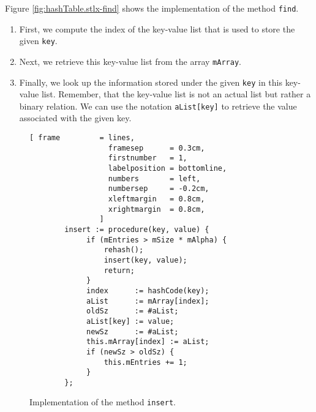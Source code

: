 Figure \ref{fig:hashTable.stlx-find} shows the implementation of the method \texttt{find}.
\begin{enumerate}
\item First, we compute the index of the key-value list that is used to store the given
      \texttt{key}.
\item Next, we retrieve this key-value list from the array \texttt{mArray}.
\item Finally, we look up the information stored under the given \texttt{key} in this 
      key-value list.  Remember, that the key-value list is not an actual list but rather a binary
      relation.  We can use the notation \texttt{aList[key]} to retrieve the value associated with
      the given key.
\end{enumerate}

\begin{figure}[!ht]
\centering
\begin{Verbatim}[ frame         = lines, 
                  framesep      = 0.3cm, 
                  firstnumber   = 1,
                  labelposition = bottomline,
                  numbers       = left,
                  numbersep     = -0.2cm,
                  xleftmargin   = 0.8cm,
                  xrightmargin  = 0.8cm,
                ]
        insert := procedure(key, value) {
             if (mEntries > mSize * mAlpha) {
                 rehash();
                 insert(key, value);
                 return;
             }
             index      := hashCode(key);
             aList      := mArray[index];
             oldSz      := #aList;
             aList[key] := value;
             newSz      := #aList;
             this.mArray[index] := aList;
             if (newSz > oldSz) {
                 this.mEntries += 1;
             }    
        };
\end{Verbatim}
\vspace*{-0.3cm}
\caption{Implementation of the method \texttt{insert}.}
\label{fig:hashTable.stlx-insert}
\end{figure}

